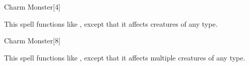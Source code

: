 \begin{spellsection}{Charm Monster}[4]
    \begin{spellheader}
    \end{spellheader}
    \begin{spellcontent}
        \begin{spelltargetinginfo}
        \end{spelltargetinginfo}
        \begin{spelleffects}
            \spellspecial This spell functions like , except that it affects creatures of any type.
        \end{spelleffects}
    \end{spellcontent}
    \begin{spellfooter}
        \miscastrandom
    \end{spellfooter}
\end{spellsection}

\begin{spellsection}[Mass]{Charm Monster}[8]
    \begin{spellheader}
    \end{spellheader}
    \begin{spellcontent}
        \begin{spelltargetinginfo}
        \end{spelltargetinginfo}
        \begin{spelleffects}
            \spellspecial This spell functions like , except that it affects multiple creatures of any type.
        \end{spelleffects}
    \end{spellcontent}
    \begin{spellfooter}
        \miscastyou
    \end{spellfooter}
\end{spellsection}

